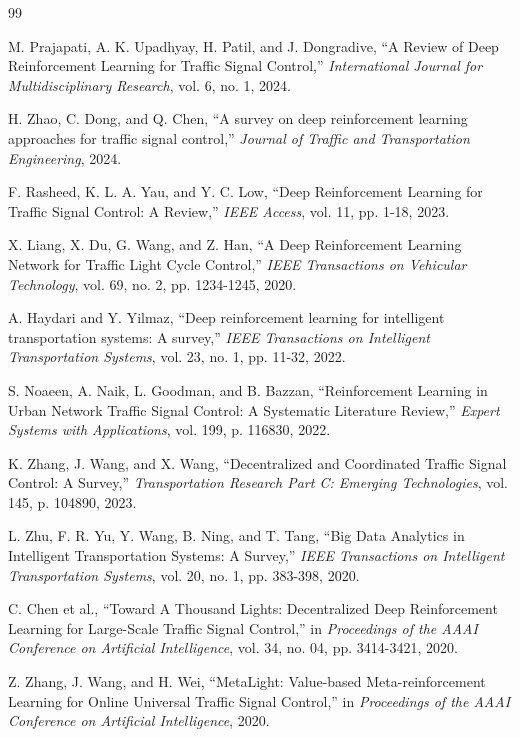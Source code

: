 \documentclass[12pt, a4paper]{report}
\begin{document}
\begin{thebibliography}{99}

 M. Prajapati, A. K. Upadhyay, H. Patil, and J. Dongradive, ``A Review of Deep Reinforcement Learning for Traffic Signal Control,'' \textit{International Journal for Multidisciplinary Research}, vol. 6, no. 1, 2024.

 H. Zhao, C. Dong, and Q. Chen, ``A survey on deep reinforcement learning approaches for traffic signal control,'' \textit{Journal of Traffic and Transportation Engineering}, 2024.

 F. Rasheed, K. L. A. Yau, and Y. C. Low, ``Deep Reinforcement Learning for Traffic Signal Control: A Review,'' \textit{IEEE Access}, vol. 11, pp. 1-18, 2023.

 X. Liang, X. Du, G. Wang, and Z. Han, ``A Deep Reinforcement Learning Network for Traffic Light Cycle Control,'' \textit{IEEE Transactions on Vehicular Technology}, vol. 69, no. 2, pp. 1234-1245, 2020.

 A. Haydari and Y. Yilmaz, ``Deep reinforcement learning for intelligent transportation systems: A survey,'' \textit{IEEE Transactions on Intelligent Transportation Systems}, vol. 23, no. 1, pp. 11-32, 2022.

 S. Noaeen, A. Naik, L. Goodman, and B. Bazzan, ``Reinforcement Learning in Urban Network Traffic Signal Control: A Systematic Literature Review,'' \textit{Expert Systems with Applications}, vol. 199, p. 116830, 2022.

 K. Zhang, J. Wang, and X. Wang, ``Decentralized and Coordinated Traffic Signal Control: A Survey,'' \textit{Transportation Research Part C: Emerging Technologies}, vol. 145, p. 104890, 2023.

 L. Zhu, F. R. Yu, Y. Wang, B. Ning, and T. Tang, ``Big Data Analytics in Intelligent Transportation Systems: A Survey,'' \textit{IEEE Transactions on Intelligent Transportation Systems}, vol. 20, no. 1, pp. 383-398, 2020.

 C. Chen et al., ``Toward A Thousand Lights: Decentralized Deep Reinforcement Learning for Large-Scale Traffic Signal Control,'' in \textit{Proceedings of the AAAI Conference on Artificial Intelligence}, vol. 34, no. 04, pp. 3414-3421, 2020.

 Z. Zhang, J. Wang, and H. Wei, ``MetaLight: Value-based Meta-reinforcement Learning for Online Universal Traffic Signal Control,'' in \textit{Proceedings of the AAAI Conference on Artificial Intelligence}, 2020.


\end{thebibliography}
\end{document}
